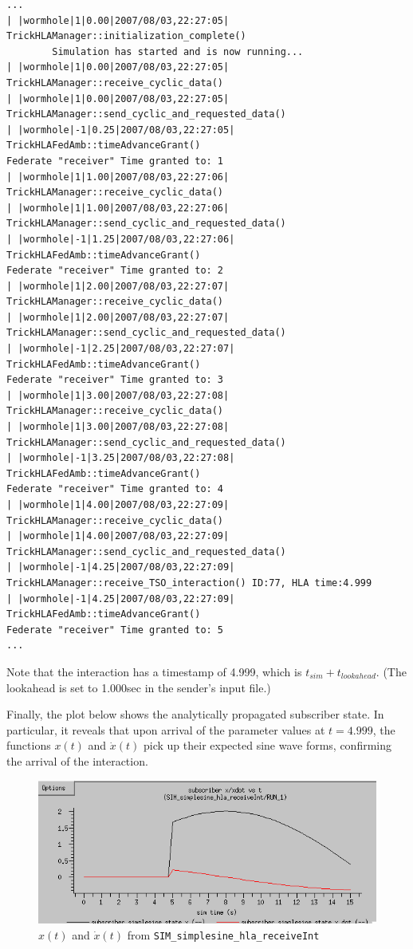\begin{lstlisting}[numbers=none,caption={{\em receiver} output showing interaction at $t=4$}]
...
| |wormhole|1|0.00|2007/08/03,22:27:05| TrickHLAManager::initialization_complete()
        Simulation has started and is now running...
| |wormhole|1|0.00|2007/08/03,22:27:05| TrickHLAManager::receive_cyclic_data()
| |wormhole|1|0.00|2007/08/03,22:27:05| TrickHLAManager::send_cyclic_and_requested_data()
| |wormhole|-1|0.25|2007/08/03,22:27:05| TrickHLAFedAmb::timeAdvanceGrant()
Federate "receiver" Time granted to: 1
| |wormhole|1|1.00|2007/08/03,22:27:06| TrickHLAManager::receive_cyclic_data()
| |wormhole|1|1.00|2007/08/03,22:27:06| TrickHLAManager::send_cyclic_and_requested_data()
| |wormhole|-1|1.25|2007/08/03,22:27:06| TrickHLAFedAmb::timeAdvanceGrant()
Federate "receiver" Time granted to: 2
| |wormhole|1|2.00|2007/08/03,22:27:07| TrickHLAManager::receive_cyclic_data()
| |wormhole|1|2.00|2007/08/03,22:27:07| TrickHLAManager::send_cyclic_and_requested_data()
| |wormhole|-1|2.25|2007/08/03,22:27:07| TrickHLAFedAmb::timeAdvanceGrant()
Federate "receiver" Time granted to: 3
| |wormhole|1|3.00|2007/08/03,22:27:08| TrickHLAManager::receive_cyclic_data()
| |wormhole|1|3.00|2007/08/03,22:27:08| TrickHLAManager::send_cyclic_and_requested_data()
| |wormhole|-1|3.25|2007/08/03,22:27:08| TrickHLAFedAmb::timeAdvanceGrant()
Federate "receiver" Time granted to: 4
| |wormhole|1|4.00|2007/08/03,22:27:09| TrickHLAManager::receive_cyclic_data()
| |wormhole|1|4.00|2007/08/03,22:27:09| TrickHLAManager::send_cyclic_and_requested_data()
| |wormhole|-1|4.25|2007/08/03,22:27:09| TrickHLAManager::receive_TSO_interaction() ID:77, HLA time:4.999
| |wormhole|-1|4.25|2007/08/03,22:27:09| TrickHLAFedAmb::timeAdvanceGrant()
Federate "receiver" Time granted to: 5
...
\end{lstlisting}

Note that the interaction has a timestamp of 4.999, which is
$t_{sim} + t_{lookahead}$.
(The lookahead is set to 1.000sec in the sender's input file.)

Finally, the plot below shows the analytically propagated subscriber state.
In particular, it reveals that upon arrival of the parameter values
at $t=4.999$, the functions $x(t)$ and $\dot{x}(t)$ pick up their expected
sine wave forms, confirming the arrival of the interaction.

\begin{figure}[h]
  \begin{center}
    \includegraphics[width=4.5in]{TrickHLAUser-receiveInt.png}
  \end{center}
\caption{$x(t)$ and $\dot{x}(t)$ from {\tt SIM\_simplesine\_hla\_receiveInt}}
\label{fig:hla-receiveInt}
\end{figure}
